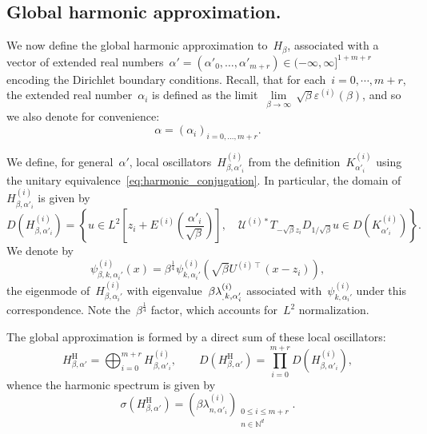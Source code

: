 \documentclass[10pt]{article}
\newcommand{\n}{\mathrm{n}}
\newcommand{\N}{\mathbb N}
\newcommand{\1}{\mathbbm 1}
\newcommand{\halfSpace}[1]{E^{(#1)}}
\newcommand{\Ki}[1]{K^{(i)}_{#1}}
\newcommand{\psii}[2]{\psi^{(i)}_{#1,#2}}
\newcommand{\lambdai}[2]{\lambda^{(i)}_{#1,#2}}
\newcommand{\varepsiloni}{\varepsilon^{(i)}}
\begin{document}
    \subsection{Global harmonic approximation.\newline}\label{subsec:global_harm_operator}
    We now define the global harmonic approximation to~$H_\beta$, associated with a vector of extended real numbers~$\alpha' = (\alpha'_0,\dots,\alpha'_{m+r}) \in (-\infty,\infty]^{1+m+r}$ encoding the Dirichlet boundary conditions.
    Recall, that for each~$i=0,\dotsm,m+r$, the extended real number~$\alpha_i$ is defined as the limit~$\underset{\beta\to\infty}{\lim}\,\sqrt\beta \varepsiloni(\beta)$, and so we also denote for convenience:
    \begin{equation}
        \label{eq:global_alpha}
        \alpha = \left(\alpha_i\right)_{i=0,\dots,m+r}.
    \end{equation}
    
    We define, for general~$\alpha'$, local oscillators~$H^{(i)}_{\beta,\alpha'_i}$ from the definition~$\Ki{\alpha'_i}$ using the unitary equivalence~\eqref{eq:harmonic_conjugation}. In particular, the domain of~$H_{\beta,\alpha'_i}^{(i)}$ is given by
    \begin{equation}
        \label{eq:local_harm_domain}
        D(H^{(i)}_{\beta,\alpha'_i}) = \left\{ u \in L^2\left[z_i + \halfSpace{i}\left(\frac{\alpha'_i}{\sqrt\beta}\right)\right],\quad  \mathcal U^{(i)*}T_{-\sqrt\beta z_i}D_{1/\sqrt\beta}u\in D(\Ki{\alpha'_i})\right\}.
    \end{equation}
    We denote by
    \begin{equation}
        \label{eq:harmonic_eigenmode}
        \psii{\beta,k}{\alpha_i'}(x) = \beta^{\frac14}\psii{k}{\alpha_i'}(\sqrt\beta U^{(i)\intercal}(x-z_i)),
    \end{equation}
    the eigenmode of~$H^{(i)}_{\beta,\alpha_i'}$ with eigenvalue~$\beta\lambdai_{k,\alpha_i'}$ associated with~$\psii{k}{\alpha_i'}$ under this correspondence. Note the~$\beta^{\frac14}$ factor, which accounts for~$L^2$ normalization.

    The global approximation is formed by a direct sum of these local oscillators:
    \begin{equation}
        \label{eq:global_harmonic_approximation_conj}
        H_{\beta,\alpha'}^{\mathrm H} = \bigoplus_{i=0}^{m+r} H^{(i)}_{\beta,\alpha'_i},\qquad D(H_{\beta,\alpha'}^{\mathrm H}) = \prod_{i=0}^{m+r} D(H^{(i)}_{\beta,\alpha'_i}),
    \end{equation}
    whence the harmonic spectrum is given by
    \begin{equation}
        \label{eq:full_harmonic_approximation_spectrum}
        \sigma(H_{\beta,\alpha'}^{\mathrm H}) = \left(\beta\lambdai{n}{\alpha'_i}\right)_{\substack{0\leq i\leq m+r\\n\in\N^d}}.
    \end{equation}
    
\end{document}
